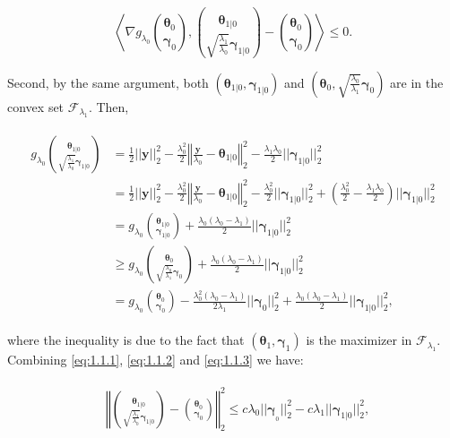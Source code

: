 \begin{equation}
    \label{eq:1.1.2}
    \left\langle\nabla g_{\lambda_0}\binom{\boldsymbol\theta_{0}}{\boldsymbol\gamma_{0}},\binom{\boldsymbol\theta_{1|0}}{\sqrt{\frac{\lambda_1}{\lambda_0}}\boldsymbol\gamma_{1|0}}-\binom{\boldsymbol\theta_{0}}{\boldsymbol\gamma_{0}}\right\rangle\leq 0.
\end{equation}

Second, by the same argument, both $(\boldsymbol\theta_{1|0},\boldsymbol\gamma_{1|0})$ and $\left(\boldsymbol\theta_{0},\sqrt{\frac{\lambda_0}{\lambda_1}}\boldsymbol\gamma_{0}\right)$ are in the convex set $\mathcal{F}_{\lambda_1}$. Then,

\begin{gather}
    \label{eq:1.1.3}
    \begin{aligned}
        g_{\lambda_0}\binom{\boldsymbol\theta_{1|0}}{\sqrt{\frac{\lambda_1}{\lambda_0}}\boldsymbol\gamma_{1|0}}&=\frac{1}{2}||\boldsymbol y||_2^2-\frac{\lambda_0^2}{2}\left\Vert\frac{\boldsymbol y}{\lambda_0}-\boldsymbol\theta_{1|0}\right\Vert_2^2-\frac{\lambda_1\lambda_0}{2}||\boldsymbol\gamma_{1|0}||_2^2\\
        &= \frac{1}{2}||\boldsymbol y||_2^2-\frac{\lambda_0^2}{2}\left\Vert\frac{\boldsymbol y}{\lambda_0}-\boldsymbol\theta_{1|0}\right\Vert_2^2-\frac{\lambda_0^2}{2}||\boldsymbol\gamma_{1|0}||_2^2+\left(\frac{\lambda_0^2}{2}-\frac{\lambda_1\lambda_0}{2}\right)||\boldsymbol\gamma_{1|0}||_2^2\\
        &=g_{\lambda_0}\binom{\boldsymbol\theta_{1|0}}{\boldsymbol\gamma_{1|0}}+\frac{\lambda_0(\lambda_0-\lambda_1)}{2}||\boldsymbol\gamma_{1|0}||_2^2\\
        &\geq g_{\lambda_0}\binom{\boldsymbol\theta_{0}}{\sqrt{\frac{\lambda_0}{\lambda_1}}\boldsymbol\gamma_{0}}+\frac{\lambda_0(\lambda_0-\lambda_1)}{2}||\boldsymbol\gamma_{1|0}||_2^2\\
        &=g_{\lambda_0}\binom{\boldsymbol\theta_{0}}{\boldsymbol\gamma_{0}}-\frac{\lambda_0^2(\lambda_0-\lambda_1)}{2\lambda_1}||\boldsymbol\gamma_{0}||_2^2+\frac{\lambda_0(\lambda_0-\lambda_1)}{2}||\boldsymbol\gamma_{1|0}||_2^2,
    \end{aligned}
\end{gather}

where the inequality is due to the fact that $(\boldsymbol\theta_{1},\boldsymbol\gamma_{1})$ is the maximizer in $\mathcal{F}_{\lambda_1}$. Combining \eqref{eq:1.1.1}, \eqref{eq:1.1.2} and \eqref{eq:1.1.3} we have:

\begin{gather}
    \begin{aligned}
        &\left\Vert\binom{\boldsymbol\theta_{1|0}}{\sqrt{\frac{\lambda_1}{\lambda_0}}\boldsymbol\gamma_{1|0}}-\binom{\boldsymbol\theta_{0}}{\boldsymbol\gamma_{0}}\right\Vert_2^2\leq c\lambda_0||\boldsymbol\gamma_{_0}||_2^2-c\lambda_1||\boldsymbol\gamma_{1|0}||_2^2,
    \end{aligned}
\end{gather}

